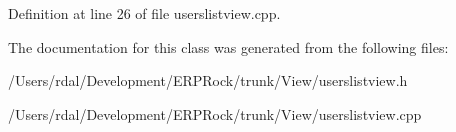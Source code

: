 \-Definition at line 26 of file userslistview.\-cpp.



\-The documentation for this class was generated from the following files\-:\begin{DoxyCompactItemize}
\item 
/\-Users/rdal/\-Development/\-E\-R\-P\-Rock/trunk/\-View/userslistview.\-h\item 
/\-Users/rdal/\-Development/\-E\-R\-P\-Rock/trunk/\-View/userslistview.\-cpp\end{DoxyCompactItemize}
